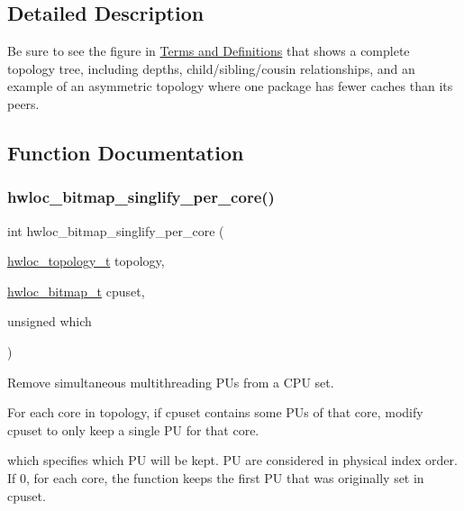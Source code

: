 \subsection{Detailed Description}
Be sure to see the figure in \hyperlink{a00380}{Terms and Definitions} that shows a complete topology tree, including depths, child/sibling/cousin relationships, and an example of an asymmetric topology where one package has fewer caches than its peers. 

\subsection{Function Documentation}
\mbox{\label{a00200_ga050646458efc8ca1120d9f124c5ad861}} 
\subsubsection{\texorpdfstring{hwloc\+\_\+bitmap\+\_\+singlify\+\_\+per\+\_\+core()}{hwloc\_bitmap\_singlify\_per\_core()}}
{\footnotesize\ttfamily int hwloc\+\_\+bitmap\+\_\+singlify\+\_\+per\+\_\+core (\begin{DoxyParamCaption}\item[{\hyperlink{a00186_ga9d1e76ee15a7dee158b786c30b6a6e38}{hwloc\+\_\+topology\+\_\+t}}]{topology,  }\item[{\hyperlink{a00205_gaa3c2bf4c776d603dcebbb61b0c923d84}{hwloc\+\_\+bitmap\+\_\+t}}]{cpuset,  }\item[{unsigned}]{which }\end{DoxyParamCaption})}



Remove simultaneous multithreading P\+Us from a C\+PU set. 

For each core in {\ttfamily topology}, if {\ttfamily cpuset} contains some P\+Us of that core, modify {\ttfamily cpuset} to only keep a single PU for that core.

{\ttfamily which} specifies which PU will be kept. PU are considered in physical index order. If 0, for each core, the function keeps the first PU that was originally set in {\ttfamily cpuset}.

